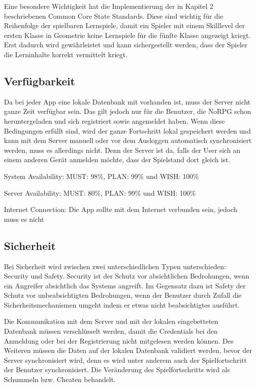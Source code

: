 {		Eine besondere Wichtigkeit hat die Implementierung der in Kapitel 2 beschriebenen Common Core State Standards. Diese sind wichtig für die Reihenfolge der spielbaren Lernspiele, damit ein Spieler mit einem Skilllevel der ersten Klasse in Geometrie keine Lernspiele für die fünfte Klasse angezeigt kriegt. Erst dadurch wird gewährleistet und kann sichergestellt werden, dass der Spieler die Lerninhalte korrekt vermittelt kriegt.
	
	\subsection{Verfügbarkeit}
		
		Da bei jeder App eine lokale Datenbank mit vorhanden ist, muss der Server nicht ganze Zeit verfügbar sein. Das gilt jedoch nur für die Benutzer, die NoRPG schon heruntergeladen und sich registriert sowie angemeldet haben. Wenn diese Bedingungen erfüllt sind, wird der ganze Fortschritt lokal gespeichert werden und kann mit dem Server manuell oder vor dem Ausloggen automatisch synchronisiert werden, muss es allerdings nicht. Denn der Server ist da, falls der User sich an einem anderen Gerät anmelden möchte, dass der Spielstand dort gleich ist. 
		
		System Availability: MUST: 98\%, PLAN: 99\% und WISH: 100\%
		
		Server Availability: MUST: 80\%, PLAN: 99\% und WISH: 100\%
		
		Internet Connection: Die App sollte mit dem Internet verbunden sein, jedoch muss es nicht
		
	\subsection{Sicherheit}
		Bei Sicherheit wird zwischen zwei unterschiedlichen Typen unterschieden: Security und Safety. Security ist der Schutz vor absichtlichen Bedrohungen, wenn ein Angreifer absichtlich das Systems angreift. Im Gegensatz dazu ist Safety der Schutz vor unbeabsichtigten Bedrohungen, wenn der Benutzer durch Zufall die Sicherheitsmechanismen umgeht indem er etwas nicht beabsichtigtes ausführt.
		
		Die Kommunikation mit dem Server und mit der lokalen eingebetteten Datenbank müssen verschlüsselt werden, damit die Credentials bei den Anmeldung oder bei der Registrierung nicht mitgelesen werden können. Des Weiteren müssen die Daten auf der lokalen Datenbank validiert werden, bevor der Server synchronisiert wird, denn es wird unter anderem auch der Spielfortschritt der Benutzer synchronisiert. Die Veränderung des Spielfortschritts wird als Schummeln bzw. Cheaten behandelt.
		
}
